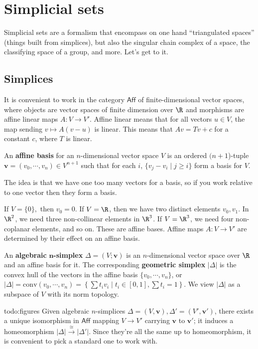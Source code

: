\section{Simplicial sets} 
Simplicial sets are a formalism that encompass on one hand ``triangulated spaces'' (things built from simplices), but also the singular chain complex of a space, the classifying space of a group, and more. Let's get to it.

\subsection{Simplices}
It is convenient to work in the category $\mathsf{Aff} $ of finite-dimensional vector spaces, where objects are vector spaces of finite dimension over $\R$ and morphisms are affine linear maps $A \colon V \to V'$. Affine linear means that for all vectors $u \in V$, the map sending $v \mapsto A(v-u)$ is linear. This means that $Av=Tv+c$ for a constant $c$, where $T$ is linear.

\begin{definition}[]
    An \textbf{affine basis} for an $n$-dimensional vector space $V$ is an ordered $(n+1$)-tuple $\mathbf v=(v_0, \cdots ,v_n ) \in V^{n+1}$ such that for each $i$, $\{v_j -v_i  \mid j\geq i\} $ form a basis for $V$.
\end{definition}
The idea is that we have one too many vectors for a basis, so if you work relative to one vector then they form a basis.
\begin{example}
    If $V= \{0\} ,$ then $v_0=0$. If $V=\R$, then we have two distinct elements $v_0,v_1$. In $\R^2$, we need three non-collinear elements in $\R^3$. If $V=\R^3$, we need four non-coplanar elements, and so on. These are affine bases. Affine maps $A \colon V \to V'$ are determined by their effect on an affine basis.
\end{example}

\begin{definition}[]
    An \textbf{algebraic} $\mathbf n$\textbf{-simplex} $\Delta =(V;\mathbf v)$ is an $n$-dimensional vector space over $\R$ and an affine basis for it. The corresponding \textbf{geometric simplex} $|\Delta |$ is the convex hull of the vectors in the affine basis $\{v_0, \cdots ,v_n \} $, or $|\Delta |= \mathrm{conv}(v_0,\cdots ,v_n )= \left\{ \sum t_i v_i \mid t_i  \in [0,1], \sum t_i =1 \right\} $.  We view $|\Delta |$ as a subspace of $V$ with its norm topology.
\end{definition}
{\color{red}todo:figures} 
Given algebraic $n$-simplices $\Delta =(V,\mathbf v),\Delta '=(V', \mathbf v') $, there exists a unique isomorphism in $\mathsf{Aff} $ mapping $V\to V'$ carrying $\mathbf v$ to $\mathbf v'$; it induces a homeomorphism $|\Delta | \xrightarrow{\cong} |\Delta '|$. Since they're all the same up to homeomorphism, it is convenient to pick a standard one to work with.

